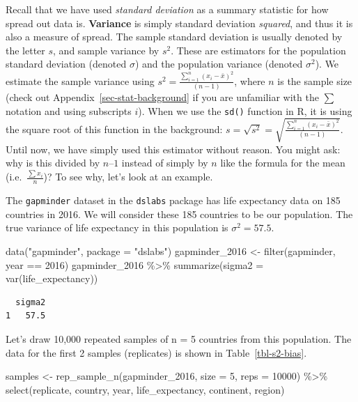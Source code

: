 \documentclass[
  letterpaper,
  DIV=11,
  numbers=noendperiod]{scrreprt}
\newenvironment{Shaded}{\begin{snugshade}}{\end{snugshade}}
\newcommand{\AttributeTok}[1]{\textcolor[rgb]{0.40,0.45,0.13}{#1}}
\newcommand{\DecValTok}[1]{\textcolor[rgb]{0.68,0.00,0.00}{#1}}
\newcommand{\FunctionTok}[1]{\textcolor[rgb]{0.28,0.35,0.67}{#1}}
\newcommand{\NormalTok}[1]{\textcolor[rgb]{0.00,0.23,0.31}{#1}}
\newcommand{\OtherTok}[1]{\textcolor[rgb]{0.00,0.23,0.31}{#1}}
\newcommand{\SpecialCharTok}[1]{\textcolor[rgb]{0.37,0.37,0.37}{#1}}
\newcommand{\StringTok}[1]{\textcolor[rgb]{0.13,0.47,0.30}{#1}}
\theoremstyle{definition}
\theoremstyle{remark}
\begin{document}
Recall that we have used \emph{standard deviation} as a summary
statistic for how spread out data is. \textbf{Variance} is simply
standard deviation \emph{squared}, and thus it is also a measure of
spread. The sample standard deviation is usually denoted by the letter
\(s\), and sample variance by \(s^2\). These are estimators for the
population standard deviation (denoted \(\sigma\)) and the population
variance (denoted \(\sigma^2\)). We estimate the sample variance using
\(s^2= \frac{\sum_{i = 1}^n(x_i - \bar{x})^2}{(n-1)}\), where \(n\) is
the sample size (check out Appendix~\ref{sec-stat-background} if you are
unfamiliar with the \(\sum\) notation and using subscripts \(i\)). When
we use the \texttt{sd()} function in R, it is using the square root of
this function in the background:
\(s= \sqrt{s^2} = \sqrt{\frac{\sum_{i = 1}^n(x_i - \bar{x})^2}{(n-1)}}\).
Until now, we have simply used this estimator without reason. You might
ask: why is this divided by \(n – 1\) instead of simply by \(n\) like
the formula for the mean (i.e.~\(\frac{\sum x_i}{n}\))? To see why,
let's look at an example.

The \texttt{gapminder} dataset in the \texttt{dslabs} package has life
expectancy data on 185 countries in 2016. We will consider these 185
countries to be our population. The true variance of life expectancy in
this population is \(\sigma^2 = 57.5\).

\begin{Shaded}
\begin{Highlighting}[]
\FunctionTok{data}\NormalTok{(}\StringTok{"gapminder"}\NormalTok{, }\AttributeTok{package =} \StringTok{"dslabs"}\NormalTok{)}
\NormalTok{gapminder\_2016 }\OtherTok{\textless{}{-}} \FunctionTok{filter}\NormalTok{(gapminder, year }\SpecialCharTok{==} \DecValTok{2016}\NormalTok{)}
\NormalTok{gapminder\_2016 }\SpecialCharTok{\%\textgreater{}\%} 
  \FunctionTok{summarize}\NormalTok{(}\AttributeTok{sigma2 =} \FunctionTok{var}\NormalTok{(life\_expectancy))}
\end{Highlighting}
\end{Shaded}

\begin{verbatim}
  sigma2
1   57.5
\end{verbatim}

Let's draw 10,000 repeated samples of n = 5 countries from this
population. The data for the first 2 samples (replicates) is shown in
Table~\ref{tbl-s2-bias}.

\begin{Shaded}
\begin{Highlighting}[]
\NormalTok{samples }\OtherTok{\textless{}{-}} \FunctionTok{rep\_sample\_n}\NormalTok{(gapminder\_2016, }\AttributeTok{size =} \DecValTok{5}\NormalTok{, }\AttributeTok{reps =} \DecValTok{10000}\NormalTok{) }\SpecialCharTok{\%\textgreater{}\%} 
  \FunctionTok{select}\NormalTok{(replicate, country, year, life\_expectancy, continent, region)}
\end{Highlighting}
\end{Shaded}
\end{document}
